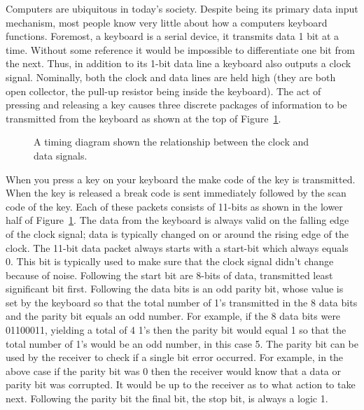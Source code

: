             Computers are ubiquitous in today's society.  Despite being its primary
            data input mechanism, most people know very little about how a computers
            keyboard functions.  Foremost, a keyboard is a serial device, it transmits
            data 1 bit at a time.  Without some reference it would be impossible
            to differentiate one bit from the next.  Thus, in addition to its 1-bit
            data line a keyboard also outputs a clock signal.  Nominally, both the
            clock and data lines are held high (they are both open collector, the
            pull-up resistor being inside the keyboard).  The act of pressing and releasing
            a key causes three discrete packages of information to be transmitted from
            the keyboard as shown at the top of Figure~\ref{fig:commonPeripheralComponentskeyboard}.

            \begin{figure}[ht]
                \caption{A timing diagram shown the relationship between the
                clock and data signals.}
                \label{fig:commonPeripheralComponentskeyboard}
            \end{figure}

            When you press a key on your keyboard the make code of the key is
            transmitted.  When the key is released a break code is sent immediately
            followed by the scan code of the key.  Each of these packets consists
            of 11-bits as shown in the lower half of Figure~\ref{fig:commonPeripheralComponentskeyboard}.
            The data from the keyboard is always valid on the falling edge of the
            clock signal; data is typically changed on or around the rising edge
            of the clock.  The 11-bit data packet always starts with a start-bit
            which always equals 0.  This bit is typically used to make sure that
            the clock signal didn't change because of noise.  Following the
            start bit are 8-bits of data, transmitted least significant bit first.
            Following the data bits is an odd parity bit, whose value is set by the
            keyboard so that the total number of 1's transmitted in the 8 data
            bits and the parity bit equals an odd number.  For example, if the
            8 data bits were 01100011, yielding a total of 4 1's then the parity
            bit would equal 1 so that the total number of 1's would be an odd
            number, in this case 5.  The parity bit can be used by the receiver
            to check if a single bit error occurred.  For example, in the above
            case if the parity bit was 0 then the receiver would know that a data
            or parity bit was corrupted.  It would be up to the receiver as
            to what action to take next.  Following the parity bit the final
            bit, the stop bit, is always a logic 1.

